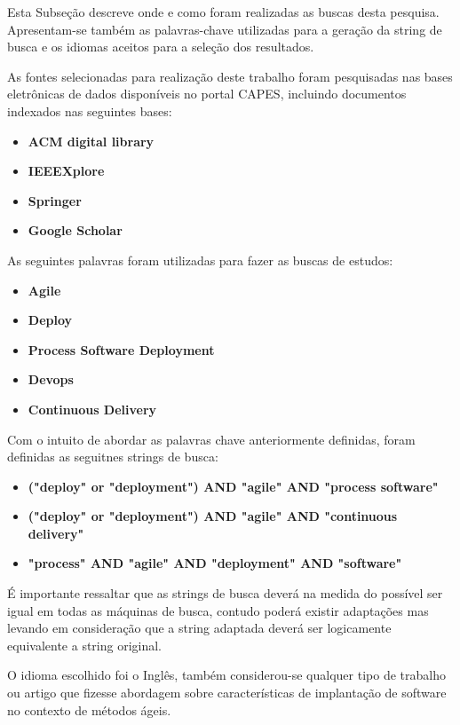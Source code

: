 \documentclass[12pt]{article}
\begin{document}
Esta  Subseção  descreve  onde  e  como  foram  realizadas
as  buscas  desta  pesquisa. Apresentam-se também as palavras-chave utilizadas para a geração da string  de busca e os idiomas aceitos para a seleção dos resultados.

As fontes selecionadas para realização deste trabalho foram pesquisadas nas bases eletrônicas de dados disponíveis no portal CAPES, incluindo documentos indexados nas seguintes bases:

 \begin{itemize}
   \item  \textbf{ACM digital library}
   \item  \textbf{IEEEXplore}
   \item  \textbf{Springer}
   \item  \textbf{Google Scholar}
 \end{itemize}

As seguintes palavras foram utilizadas para fazer as buscas de estudos:

 \begin{itemize}
   \item  \textbf{Agile}
   \item  \textbf{Deploy}
   \item  \textbf{Process Software Deployment}
   \item  \textbf{Devops}
   \item  \textbf{Continuous Delivery}
 \end{itemize}

Com o intuito de abordar as palavras chave anteriormente definidas, foram definidas as seguitnes strings de busca:

 \begin{itemize}
   \item  \textbf{("deploy" or "deployment") AND  "agile" AND "process software" }
    \item  \textbf{("deploy" or "deployment") AND  "agile" AND "continuous delivery"}
    \item  \textbf{ "process" AND  "agile" AND  "deployment" AND "software"}
 \end{itemize}

É importante ressaltar que as strings de busca deverá na medida do possível ser igual em todas as máquinas de busca, contudo poderá existir adaptações mas levando em consideração que a string adaptada deverá ser logicamente equivalente a string original.

O idioma escolhido foi o Inglês, também considerou-se qualquer tipo de trabalho ou artigo que fizesse abordagem sobre características de implantação de software no contexto de métodos ágeis.
\end{document}
